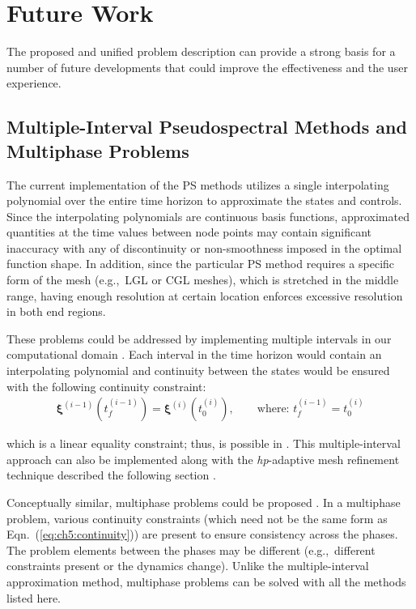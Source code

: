 \section{Future Work} \label{sec:ch5:future:work}

The proposed \apgp{} and unified \lqdo{} problem description can provide a strong basis for a number of future developments that could improve the effectiveness and the user experience.

\subsection{Multiple-Interval Pseudospectral Methods and Multiphase Problems} \label{sec:ch5:multipleinterval}

The current implementation of the PS methods utilizes a single interpolating polynomial over the entire time horizon to approximate the states and controls.
Since the interpolating polynomials are continuous basis functions, approximated quantities at the time values between node points may contain significant inaccuracy with any of discontinuity or non-smoothness imposed in the optimal function shape.
In addition, since the particular PS method requires a specific form of the mesh (e.g.,~LGL or CGL meshes), which is stretched in the middle range, having enough resolution at certain location enforces excessive resolution in both end regions.

These problems could be addressed by implementing multiple intervals in our computational domain \cite{Herber2015a, Darby2009b, Patterson2014a}.
Each interval in the time horizon would contain an interpolating polynomial and continuity between the states would be ensured with the following continuity constraint:
\begin{align} \label{eq:ch5:continuity}
\bm{\xi}^{(i-1)}(t^{(i-1)}_f) = \bm{\xi}^{(i)}(t^{(i)}_0), \qquad \text{where:  } t^{(i-1)}_f = t^{(i)}_0
\end{align}

\noindent which is a linear equality constraint; thus, is possible in \lqdo.
This multiple-interval approach can also be implemented along with the \textit{hp}-adaptive mesh refinement technique described the following section \cite{Gong2008a, Darby2009b, Fujikawa2014a}.

Conceptually similar, multiphase problems could be proposed \cite{Patterson2014a}.
In a multiphase problem, various continuity constraints (which need not be the same form as Eqn.~(\ref{eq:ch5:continuity})) are present to ensure consistency across the phases.
The problem elements between the phases may be different (e.g.,~different constraints present or the dynamics change).
Unlike the multiple-interval approximation method, multiphase problems can be solved with all the methods listed here.

